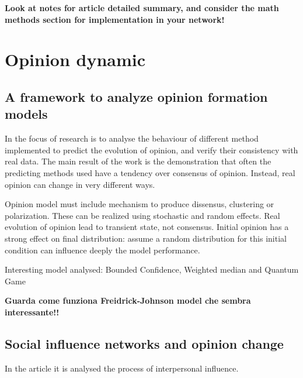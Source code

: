 \documentclass[a4paper,11pt]{scrartcl}
\begin{document}
\textbf{Look at notes for article detailed summary, and consider the math methods section for implementation in your network!}

\section{Opinion dynamic}

	\subsection{A framework to analyze opinion formation models}
	In \cite{Devia2022} the focus of research is to analyse the behaviour of different method implemented to predict the evolution of opinion, and verify their consistency with real data. The main result of the work is the demonstration that often the predicting methods used have a tendency over consensus of opinion. Instead, real opinion can change in very different ways. 
	  	
	  Opinion model must include mechanism to produce dissensus, clustering or polarization. These can be realized using stochastic and random effects. Real evolution of opinion lead to transient state, not consensus. Initial opinion has a strong effect on final distribution: assume a random distribution for this initial condition can influence deeply the model performance. 
	  
	  Interesting model analysed: Bounded Confidence, Weighted median and Quantum Game
	  
	  \textbf{Guarda come funziona Freidrick-Johnson model che sembra interessante!!}
	  
	  \subsection{Social influence networks and opinion change}
	  In the article \cite{Friedkin99} it is analysed the process of interpersonal influence. 
	  
\end{document}
